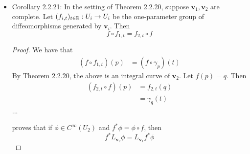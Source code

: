 \documentclass[../notes.tex]{subfiles}
\begin{document}
\begin{itemize}
\begin{proof}
\begin{align*}
            \bm{v}_1(\gamma(t)) &= \left( \gamma(t),\eval{\textstyle\dv{\gamma}{t}}_t \right)&
            \dd f_p(\bm{v}_1(p)) &= \bm{v}_2(f(p))
        \end{align*}
        Let $p=\gamma(t)$ and $q=f(p)$. Then
        \begin{align*}
            \bm{v}_2((f\circ\gamma)(t)) &= \bm{v}_2(f(p))\\
            &= \dd f_p(\bm{v}_1(p))\\
            &= \dd f_p(\bm{v}_1(\gamma(t)))\\
            &= \dd f_p\left( \gamma(t),\eval{\textstyle\dv{\gamma}{t}}_t \right)\\
            &= \dd f_p\left( p,\eval{\textstyle\dv{\gamma}{t}}_t \right)\\
            &= \left( q,Df(p)\left( \eval{\textstyle\dv{\gamma}{t}}_t \right) \right)\\
            &= \left( (f\circ\gamma)(t),\eval{\textstyle\dv{t}(f\circ\gamma)}_t \right)
        \end{align*}
        as desired.
    \end{proof}
    \item Corollary 2.2.21: In the setting of Theorem 2.2.20, suppose $\bm{v}_1,\bm{v}_2$ are complete. Let $(f_{i,t})_{t\in\mathbb{R}}:U_i\to U_i$ be the one-parameter group of diffeomorphisms generated by $\bm{v}_i$. Then
    \begin{equation*}
        f\circ f_{1,t} = f_{2,t}\circ f
    \end{equation*}
    \begin{proof}
        We have that
        \begin{align*}
            (f\circ f_{1,t})(p) &= (f\circ\gamma_p)(t)
        \end{align*}
        By Theorem 2.2.20, the above is an integral curve of $\bm{v}_2$. Let $f(p)=q$. Then
        \begin{align*}
            (f_{2,t}\circ f)(p) &= f_{2,t}(q)\\
            &= \gamma_q(t)
        \end{align*}
        ...\par
        \textcite{bib:DifferentialForms} proves that if $\phi\in C^\infty(U_2)$ and $f^*\phi=\phi\circ f$, then
        \begin{equation*}
            f^*L_{\bm{v}_2}\phi = L_{\bm{v}_1}f^*\phi

\end{equation*}
\end{proof}
\end{itemize}
\end{document}
